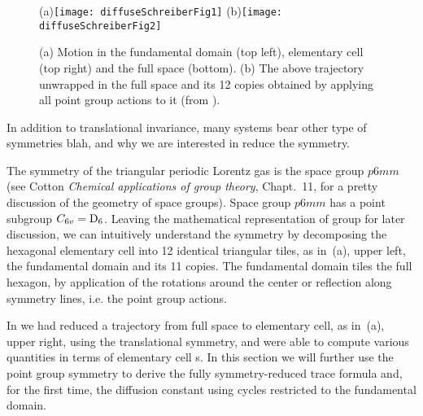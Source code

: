 


\begin{figure}[htbp]
  \begin{center}
    (a)\;\texttt{[image: diffuseSchreiberFig1]}
    (b)\texttt{[image: diffuseSchreiberFig2]}
  \end{center}
  \caption[]{\label{fig-schrieberFig12}
  (a) Motion in the fundamental domain (top left), elementary cell (top
      right) and the full space (bottom).
  (b) The above trajectory unwrapped in the full space and its 12 copies
    obtained by applying all point group  actions to it (from
    ).
  }
\end{figure}

In addition to translational invariance, many systems bear other type of
symmetries blah, and why we are interested in reduce the symmetry.

The symmetry of the triangular periodic Lorentz gas is the space group
$p6mm$ (see Cotton {\em Chemical applications of group
theory},  Chapt.~11, for a pretty discussion of the geometry of space
groups). Space group $p6mm$ has a point subgroup $C_{6v}=\textrm{D}_{6}$. Leaving
the mathematical representation of group for later discussion, we can
intuitively understand the symmetry by decomposing the hexagonal
elementary cell into 12 identical triangular tiles, as in
\,(a), upper left, the fundamental domain and
its 11 copies. The fundamental domain tiles the full hexagon, by
application of the  rotations around the center or reflection along
symmetry lines, i.e. the point group actions.

In  we had reduced a trajectory from full space to
elementary cell, as in \,(a), upper right,
using the translational symmetry, and were able to compute various
quantities in terms of elementary cell \po s. In this section we will
further use the point group symmetry to derive the fully symmetry-reduced
trace formula and, for the first time, the diffusion constant using
cycles restricted to the fundamental domain.

